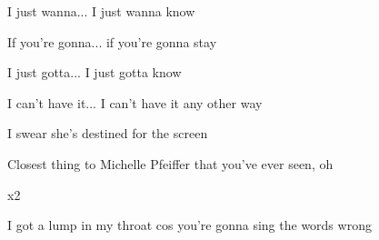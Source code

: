 \begin{song}
\bigskip

 \par

\bigskip

 \par
{}I just wanna... I just wanna know  \par
{} If you're gonna... if you're gonna stay  \par
{} I just gotta... I just gotta know  \par
{}I can't have it... I can't have it any other way \par
{} \par
I  swear she's destined for the screen \par
{}Closest thing to Michelle Pfeiffer that you've ever seen, oh \par

\bigskip


 x2 \par

\bigskip

I got a lump in my throat cos you're gonna sing the words wrong \par

\end{song}
